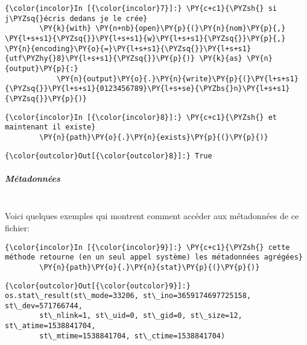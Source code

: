     \begin{Verbatim}[commandchars=\\\{\}]
{\color{incolor}In [{\color{incolor}7}]:} \PY{c+c1}{\PYZsh{} si j\PYZsq{}écris dedans je le crée}
        \PY{k}{with} \PY{n+nb}{open}\PY{p}{(}\PY{n}{nom}\PY{p}{,} \PY{l+s+s1}{\PYZsq{}}\PY{l+s+s1}{w}\PY{l+s+s1}{\PYZsq{}}\PY{p}{,} \PY{n}{encoding}\PY{o}{=}\PY{l+s+s1}{\PYZsq{}}\PY{l+s+s1}{utf\PYZhy{}8}\PY{l+s+s1}{\PYZsq{}}\PY{p}{)} \PY{k}{as} \PY{n}{output}\PY{p}{:}
            \PY{n}{output}\PY{o}{.}\PY{n}{write}\PY{p}{(}\PY{l+s+s1}{\PYZsq{}}\PY{l+s+s1}{0123456789}\PY{l+s+se}{\PYZbs{}n}\PY{l+s+s1}{\PYZsq{}}\PY{p}{)}
\end{Verbatim}


    \begin{Verbatim}[commandchars=\\\{\}]
{\color{incolor}In [{\color{incolor}8}]:} \PY{c+c1}{\PYZsh{} et maintenant il existe}
        \PY{n}{path}\PY{o}{.}\PY{n}{exists}\PY{p}{(}\PY{p}{)}
\end{Verbatim}


\begin{Verbatim}[commandchars=\\\{\}]
{\color{outcolor}Out[{\color{outcolor}8}]:} True
\end{Verbatim}
            
    \hypertarget{muxe9tadonnuxe9es}{%
\subparagraph{Métadonnées\\\\}\label{muxe9tadonnuxe9es}}

    Voici quelques exemples qui montrent comment accéder aux métadonnées de
ce fichier:

    \begin{Verbatim}[commandchars=\\\{\}]
{\color{incolor}In [{\color{incolor}9}]:} \PY{c+c1}{\PYZsh{} cette méthode retourne (en un seul appel système) les métadonnées agrégées}
        \PY{n}{path}\PY{o}{.}\PY{n}{stat}\PY{p}{(}\PY{p}{)}
\end{Verbatim}


\begin{Verbatim}[commandchars=\\\{\}]
{\color{outcolor}Out[{\color{outcolor}9}]:} os.stat\_result(st\_mode=33206, st\_ino=3659174697725158, st\_dev=571766744,
        st\_nlink=1, st\_uid=0, st\_gid=0, st\_size=12, st\_atime=1538841704,
        st\_mtime=1538841704, st\_ctime=1538841704)
\end{Verbatim}
            
